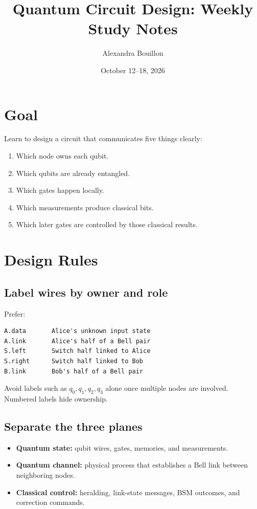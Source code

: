 \documentclass[11pt]{article}
\title{Quantum Circuit Design: Weekly Study Notes}
\author{Alexandra Bouillon}
\date{October 12--18, 2026}
\begin{document}
\maketitle

\section{Goal}

Learn to design a circuit that communicates five things clearly:

\begin{enumerate}
    \item Which node owns each qubit.
    \item Which qubits are already entangled.
    \item Which gates happen locally.
    \item Which measurements produce classical bits.
    \item Which later gates are controlled by those classical results.
\end{enumerate}

\section{Design Rules}

\subsection{Label wires by owner and role}

Prefer:

\begin{verbatim}
A.data       Alice's unknown input state
A.link       Alice's half of a Bell pair
S.left       Switch half linked to Alice
S.right      Switch half linked to Bob
B.link       Bob's half of a Bell pair
\end{verbatim}

Avoid labels such as \(q_0,q_1,q_2,q_3\) alone once multiple nodes are involved. Numbered labels hide ownership.

\subsection{Separate the three planes}

\begin{itemize}
    \item \textbf{Quantum state:} qubit wires, gates, memories, and measurements.
    \item \textbf{Quantum channel:} physical process that establishes a Bell link between neighboring nodes.
    \item \textbf{Classical control:} heralding, link-state messages, BSM outcomes, and correction commands.
\end{itemize}
\end{document}
